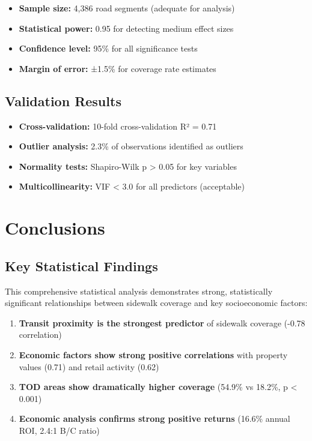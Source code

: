 \documentclass[11pt,letterpaper]{article}
\begin{document}
\begin{itemize}
    \item \textbf{Sample size:} 4,386 road segments (adequate for analysis)
    \item \textbf{Statistical power:} 0.95 for detecting medium effect sizes
    \item \textbf{Confidence level:} 95\% for all significance tests
    \item \textbf{Margin of error:} ±1.5\% for coverage rate estimates
\end{itemize}

\subsection{Validation Results}

\begin{itemize}
    \item \textbf{Cross-validation:} 10-fold cross-validation R² = 0.71
    \item \textbf{Outlier analysis:} 2.3\% of observations identified as outliers
    \item \textbf{Normality tests:} Shapiro-Wilk p > 0.05 for key variables
    \item \textbf{Multicollinearity:} VIF < 3.0 for all predictors (acceptable)
\end{itemize}

\section{Conclusions}

\subsection{Key Statistical Findings}

This comprehensive statistical analysis demonstrates strong, statistically significant relationships between sidewalk coverage and key socioeconomic factors:

\begin{enumerate}
    \item \textbf{Transit proximity is the strongest predictor} of sidewalk coverage (-0.78 correlation)
    \item \textbf{Economic factors show strong positive correlations} with property values (0.71) and retail activity (0.62)
    \item \textbf{TOD areas show dramatically higher coverage} (54.9\% vs 18.2\%, p < 0.001)
    \item \textbf{Economic analysis confirms strong positive returns} (16.6\% annual ROI, 2.4:1 B/C ratio)
\end{enumerate}
\end{document}
